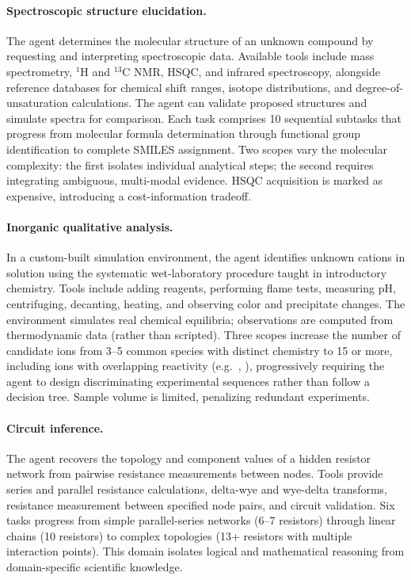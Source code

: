 \paragraph{Spectroscopic structure elucidation.}
The agent determines the molecular structure of an unknown compound by requesting and interpreting spectroscopic data\autocite{Banfi2008nmr, Jablonka2022making, Binev2007prediction}. Available tools include mass spectrometry, $^{1}$H and $^{13}$C NMR, HSQC, and infrared spectroscopy, alongside reference databases for chemical shift ranges, isotope distributions, and degree-of-unsaturation calculations. The agent can validate proposed structures and simulate spectra for comparison. Each task comprises 10 sequential subtasks that progress from molecular formula determination through functional group identification to complete SMILES assignment. Two scopes vary the molecular complexity: the first isolates individual analytical steps; the second requires integrating ambiguous, multi-modal evidence. HSQC acquisition is marked as expensive, introducing a cost-information tradeoff.
 
\paragraph{Inorganic qualitative analysis.}
In a custom-built simulation environment, the agent identifies unknown cations in solution using the systematic wet-laboratory procedure taught in introductory chemistry.
Tools include adding reagents, performing flame tests, measuring pH, centrifuging, decanting, heating, and observing color and precipitate changes. The environment simulates real chemical equilibria; observations are computed from thermodynamic data (rather than scripted).
Three scopes increase the number of candidate ions from 3--5 common species with distinct chemistry to 15 or more, including ions with overlapping reactivity (e.g.\ , ), progressively requiring the agent to design discriminating experimental sequences rather than follow a decision tree. Sample volume is limited, penalizing redundant experiments.
 
\paragraph{Circuit inference.}
The agent recovers the topology and component values of a hidden resistor network from pairwise resistance measurements between nodes. Tools provide series and parallel resistance calculations, delta-wye and wye-delta transforms, resistance measurement between specified node pairs, and circuit validation. Six tasks progress from simple parallel-series networks (6--7 resistors) through linear chains (10 resistors) to complex topologies (13+ resistors with multiple interaction points). This domain isolates logical and mathematical reasoning from domain-specific scientific knowledge.
 

